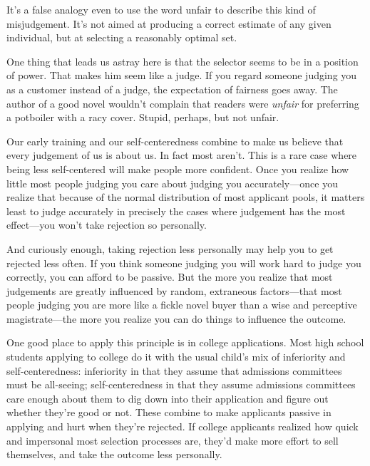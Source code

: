 It's a false analogy even to use the word unfair to describe this kind
of misjudgement. It's not aimed at producing a correct estimate of any
given individual, but at selecting a reasonably optimal set.

One thing that leads us astray here is that the selector seems to be in
a position of power. That makes him seem like a judge. If you regard
someone judging you as a customer instead of a judge, the expectation of
fairness goes away. The author of a good novel wouldn't complain that
readers were \emph{unfair} for preferring a potboiler with a racy cover.
Stupid, perhaps, but not unfair.

Our early training and our self-centeredness combine to make us believe
that every judgement of us is about us. In fact most aren't. This is a
rare case where being less self-centered will make people more
confident. Once you realize how little most people judging you care
about judging you accurately---once you realize that because of the
normal distribution of most applicant pools, it matters least to judge
accurately in precisely the cases where judgement has the most
effect---you won't take rejection so personally.

And curiously enough, taking rejection less personally may help you to
get rejected less often. If you think someone judging you will work hard
to judge you correctly, you can afford to be passive. But the more you
realize that most judgements are greatly influenced by random,
extraneous factors---that most people judging you are more like a fickle
novel buyer than a wise and perceptive magistrate---the more you realize
you can do things to influence the outcome.

One good place to apply this principle is in college applications. Most
high school students applying to college do it with the usual child's
mix of inferiority and self-centeredness: inferiority in that they
assume that admissions committees must be all-seeing; self-centeredness
in that they assume admissions committees care enough about them to dig
down into their application and figure out whether they're good or not.
These combine to make applicants passive in applying and hurt when
they're rejected. If college applicants realized how quick and
impersonal most selection processes are, they'd make more effort to sell
themselves, and take the outcome less personally.